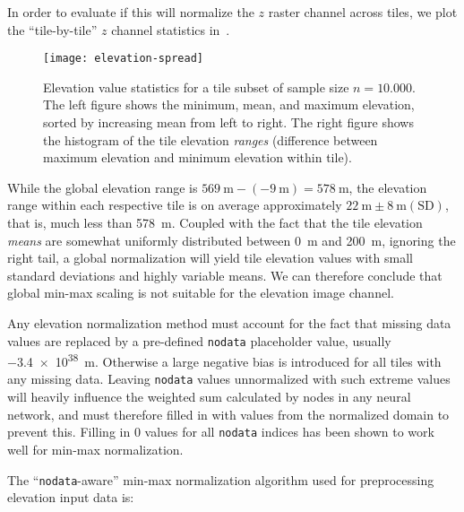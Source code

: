 In order to evaluate if this will normalize the $z$ raster channel across tiles, we plot the \enquote{tile-by-tile} $z$ channel statistics in~.

\begin{figure}[H]
  \centering
  \texttt{[image: elevation-spread]}
  \caption{
    Elevation value statistics for a tile subset of sample size $n = 10.000$.
    The left figure shows the minimum, mean, and maximum elevation, sorted by increasing mean from left to right.
    The right figure shows the histogram of the tile elevation \textit{ranges} (difference between maximum elevation and minimum elevation within tile).
  }%
  \label{fig:elevation-spread}
\end{figure}

While the global elevation range is $\SI{569}{\meter} - (\SI{-9}{\meter}) = \SI{578}{\meter}$, the elevation range within each respective tile is on average approximately $\SI{22}{\meter} \pm \SI{8}{\meter} (\mathrm{SD})$, that is, much less than \SI{578}{\meter}.
Coupled with the fact that the tile elevation \textit{means} are somewhat uniformly distributed between \SI{0}{\meter} and \SI{200}{\meter}, ignoring the right tail, a global normalization will yield tile elevation values with small standard deviations and highly variable means.
We can therefore conclude that global min-max scaling is not suitable for the elevation image channel.


Any elevation normalization method must account for the fact that missing data values are replaced by a pre-defined \texttt{nodata} placeholder value, usually \SI{-3.4e38}{\meter}.
Otherwise a large negative bias is introduced for all tiles with any missing data.
Leaving \texttt{nodata} values unnormalized with such extreme values will heavily influence the weighted sum calculated by nodes in any neural network, and must therefore filled in with values from the normalized domain to prevent this.
Filling in $0$ values for all \texttt{nodata} indices has been shown to work well for min-max normalization.

The \enquote{\texttt{nodata}-aware} min-max normalization algorithm used for preprocessing elevation input data is:

